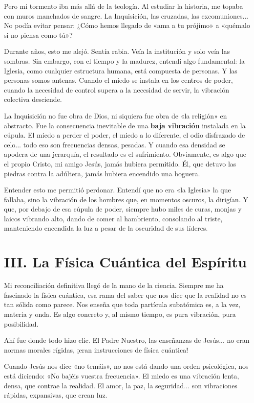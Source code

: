 \documentclass[11pt,a5paper]{book}
\begin{document}
Pero mi tormento iba más allá de la teología. Al estudiar la historia, me topaba con muros manchados de sangre. La Inquisición, las cruzadas, las excomuniones... No podía evitar pensar: ¿Cómo hemos llegado de «ama a tu prójimo» a «quémalo si no piensa como tú»?

Durante años, esto me alejó. Sentía rabia. Veía la institución y solo veía las sombras. Sin embargo, con el tiempo y la madurez, entendí algo fundamental: la Iglesia, como cualquier estructura humana, está compuesta de personas. Y las personas somos antenas. Cuando el miedo se instala en los centros de poder, cuando la necesidad de control supera a la necesidad de servir, la vibración colectiva desciende.

La Inquisición no fue obra de Dios, ni siquiera fue obra de «la religión» en abstracto. Fue la consecuencia inevitable de una \textbf{baja vibración} instalada en la cúpula. El miedo a perder el poder, el miedo a lo diferente, el odio disfrazado de celo... todo eso son frecuencias densas, pesadas. Y cuando esa densidad se apodera de una jerarquía, el resultado es el sufrimiento. Obviamente, es algo que el propio Cristo, mi amigo Jesús, jamás hubiera permitido. Él, que detuvo las piedras contra la adúltera, jamás hubiera encendido una hoguera.

Entender esto me permitió perdonar. Entendí que no era «la Iglesia» la que fallaba, sino la vibración de los hombres que, en momentos oscuros, la dirigían. Y que, por debajo de esa cúpula de poder, siempre hubo miles de curas, monjas y laicos vibrando alto, dando de comer al hambriento, consolando al triste, manteniendo encendida la luz a pesar de la oscuridad de sus líderes.

\section*{III. La Física Cuántica del Espíritu}

Mi reconciliación definitiva llegó de la mano de la ciencia. Siempre me ha fascinado la física cuántica, esa rama del saber que nos dice que la realidad no es tan sólida como parece. Nos enseña que toda partícula subatómica es, a la vez, materia y onda. Es algo concreto y, al mismo tiempo, es pura vibración, pura posibilidad.

Ahí fue donde todo hizo clic. El Padre Nuestro, las enseñanzas de Jesús... no eran normas morales rígidas, ¡eran instrucciones de física cuántica!

Cuando Jesús nos dice «no temáis», no nos está dando una orden psicológica, nos está diciendo: «No bajéis vuestra frecuencia». El miedo es una vibración lenta, densa, que contrae la realidad. El amor, la paz, la seguridad... son vibraciones rápidas, expansivas, que crean luz.
\end{document}
